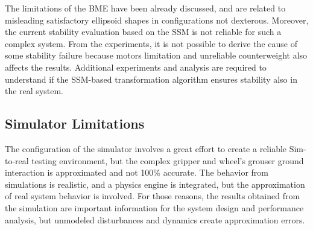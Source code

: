 The limitations of the BME have been already discussed, and are related to misleading satisfactory ellipsoid shapes in configurations not dexterous.
Moreover, the current stability evaluation based on the SSM is not reliable for such a complex system. From the experiments, it is not possible to derive the cause of some stability failure because motors limitation and unreliable counterweight also affects the results. Additional experiments and analysis are required to understand if the SSM-based transformation algorithm ensures stability also in the real system.


\subsection{Simulator Limitations}
\label{sec:control_limitations}

The configuration of the simulator involves a great effort to create a reliable Sim-to-real testing environment, but the complex gripper and wheel's grouser ground interaction is approximated and not 100\% accurate. The behavior from simulations is realistic, and a physics engine is integrated, but the approximation of real system behavior is involved. 
For those reasons, the results obtained from the simulation are important information for the system design and performance analysis, but unmodeled disturbances and dynamics create approximation errors. 
